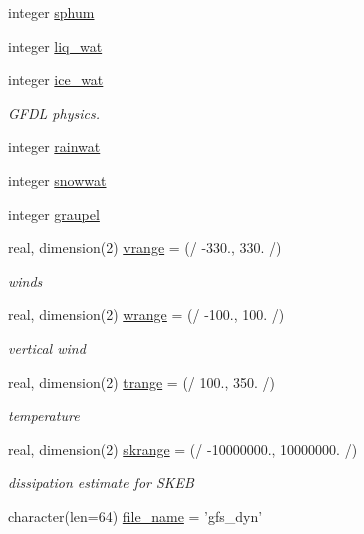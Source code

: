 \begin{DoxyCompactItemize}
\item 
integer \hyperlink{classfv__nggps__diags__mod_a0bf39b42a909bb2f0fa740a3b186eb10}{sphum}
\item 
integer \hyperlink{classfv__nggps__diags__mod_a972ef31ad558e0e5f6eec28762065b1f}{liq\-\_\-wat}
\item 
integer \hyperlink{classfv__nggps__diags__mod_a82c8e61ce22732cdb42c55c97811b4a0}{ice\-\_\-wat}
\begin{DoxyCompactList}\small\item\em G\-F\-D\-L physics. \end{DoxyCompactList}\item 
integer \hyperlink{classfv__nggps__diags__mod_adc96217bcb04e9c325be22b533ad6fda}{rainwat}
\item 
integer \hyperlink{classfv__nggps__diags__mod_a90f11314ec23054c97a9c1a6a94c0818}{snowwat}
\item 
integer \hyperlink{classfv__nggps__diags__mod_a82ca590baa623f6193156ebaabbd387c}{graupel}
\item 
real, dimension(2) \hyperlink{classfv__nggps__diags__mod_a09ecb76f21e39af3216eb05b1b913419}{vrange} = (/ -\/330., 330. /)
\begin{DoxyCompactList}\small\item\em winds \end{DoxyCompactList}\item 
real, dimension(2) \hyperlink{classfv__nggps__diags__mod_ac62774517426ba9abf37f95e33a53c75}{wrange} = (/ -\/100., 100. /)
\begin{DoxyCompactList}\small\item\em vertical wind \end{DoxyCompactList}\item 
real, dimension(2) \hyperlink{classfv__nggps__diags__mod_a63ac798b7bdc14c9cad4830deef4241d}{trange} = (/ 100., 350. /)
\begin{DoxyCompactList}\small\item\em temperature \end{DoxyCompactList}\item 
real, dimension(2) \hyperlink{classfv__nggps__diags__mod_a2f51cdf63c0bffba99bfcecb26302104}{skrange} = (/ -\/10000000., 10000000. /)
\begin{DoxyCompactList}\small\item\em dissipation estimate for S\-K\-E\-B \end{DoxyCompactList}\item 
character(len=64) \hyperlink{classfv__nggps__diags__mod_a737e86420ad5d5b431a3117ce623e313}{file\-\_\-name} = 'gfs\-\_\-dyn'

\end{DoxyCompactItemize}
